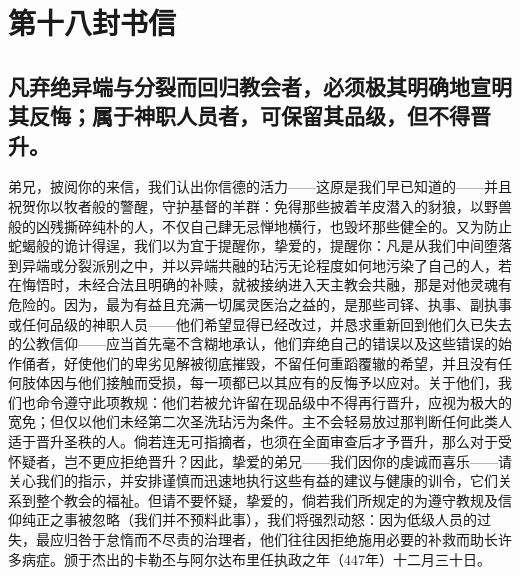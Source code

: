 

\section{第十八封书信}

\par


\subsection{凡弃绝异端与分裂而回归教会者，必须极其明确地宣明其反悔；属于神职人员者，可保留其品级，但不得晋升。}

弟兄，披阅你的来信，我们认出你信德的活力——这原是我们早已知道的——并且祝贺你以牧者般的警醒，守护基督的羊群：免得那些披着羊皮潜入的豺狼，以野兽般的凶残撕碎纯朴的人，不仅自己肆无忌惮地横行，也毁坏那些健全的。又为防止蛇蝎般的诡计得逞，我们以为宜于提醒你，挚爱的，提醒你：凡是从我们中间堕落到异端或分裂派别之中，并以异端共融的玷污无论程度如何地污染了自己的人，若在悔悟时，未经合法且明确的补赎，就被接纳进入天主教会共融，那是对他灵魂有危险的。因为，最为有益且充满一切属灵医治之益的，是那些司铎、执事、副执事或任何品级的神职人员——他们希望显得已经改过，并恳求重新回到他们久已失去的公教信仰——应当首先毫不含糊地承认，他们弃绝自己的错误以及这些错误的始作俑者，好使他们的卑劣见解被彻底摧毁，不留任何重蹈覆辙的希望，并且没有任何肢体因与他们接触而受损，每一项都已以其应有的反悔予以应对。关于他们，我们也命令遵守此项教规：他们若被允许留在现品级中不得再行晋升，应视为极大的宽免；但仅以他们未经第二次圣洗玷污为条件。主不会轻易放过那判断任何此类人适于晋升圣秩的人。倘若连无可指摘者，也须在全面审查后才予晋升，那么对于受怀疑者，岂不更应拒绝晋升？因此，挚爱的弟兄——我们因你的虔诚而喜乐——请关心我们的指示，并安排谨慎而迅速地执行这些有益的建议与健康的训令，它们关系到整个教会的福祉。但请不要怀疑，挚爱的，倘若我们所规定的为遵守教规及信仰纯正之事被忽略（我们并不预料此事），我们将强烈动怒：因为低级人员的过失，最应归咎于怠惰而不尽责的治理者，他们往往因拒绝施用必要的补救而助长许多病症。颁于杰出的卡勒丕与阿尔达布里任执政之年（447年）十二月三十日。\par


